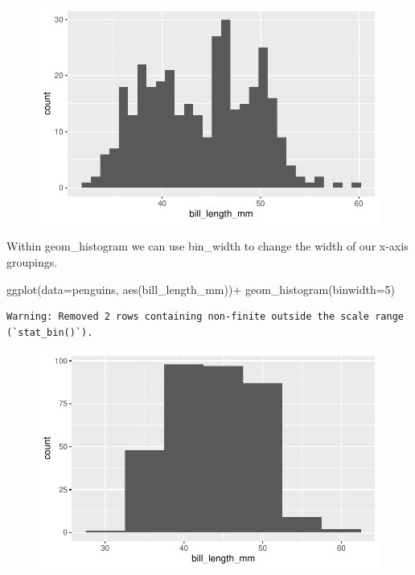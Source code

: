 \documentclass[
  letterpaper,
  DIV=11,
  numbers=noendperiod]{scrartcl}
\newenvironment{Shaded}{\begin{snugshade}}{\end{snugshade}}
\newcommand{\AttributeTok}[1]{\textcolor[rgb]{0.40,0.45,0.13}{#1}}
\newcommand{\DecValTok}[1]{\textcolor[rgb]{0.68,0.00,0.00}{#1}}
\newcommand{\FunctionTok}[1]{\textcolor[rgb]{0.28,0.35,0.67}{#1}}
\newcommand{\NormalTok}[1]{\textcolor[rgb]{0.00,0.23,0.31}{#1}}
\newcommand{\SpecialCharTok}[1]{\textcolor[rgb]{0.37,0.37,0.37}{#1}}
\begin{document}
\begin{figure}[H]

{\centering \includegraphics{Lab_2_files/figure-pdf/unnamed-chunk-6-1.pdf}

}

\end{figure}

Within geom\_histogram we can use bin\_width to change the width of our
x-axis groupings.

\begin{Shaded}
\begin{Highlighting}[]
\FunctionTok{ggplot}\NormalTok{(}\AttributeTok{data=}\NormalTok{penguins, }\FunctionTok{aes}\NormalTok{(bill\_length\_mm))}\SpecialCharTok{+}
  \FunctionTok{geom\_histogram}\NormalTok{(}\AttributeTok{binwidth=}\DecValTok{5}\NormalTok{)}
\end{Highlighting}
\end{Shaded}

\begin{verbatim}
Warning: Removed 2 rows containing non-finite outside the scale range
(`stat_bin()`).
\end{verbatim}

\begin{figure}[H]

{\centering \includegraphics{Lab_2_files/figure-pdf/unnamed-chunk-7-1.pdf}

}

\end{figure}
\end{document}
